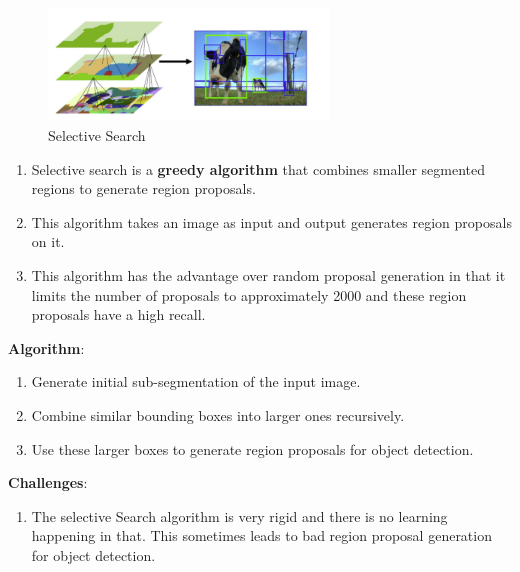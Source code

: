 \begin{table}[h]
    \begin{minipage}[t]{0.39\linewidth}
        \begin{figure}[H]
            \centering
            \includegraphics[width=\linewidth, height=3cm, keepaspectratio]{Pictures/convolutional-neural-network/rcnn-selective-search.png}
            \caption{Selective Search}
        \end{figure}        
    \end{minipage}
    \hfill
    \begin{minipage}[t]{0.59\linewidth}
        \begin{enumerate}
            \item Selective search is a \textbf{greedy algorithm} that combines smaller segmented regions to generate region proposals.
            
            \item This algorithm takes an image as input and output generates region proposals on it.
        
            \item This algorithm has the advantage over random proposal generation in that it limits the number of proposals to approximately 2000 and these region proposals have a high recall.
        \end{enumerate}    
    \end{minipage}
\end{table}


\vspace{0.2cm}
\textbf{Algorithm}:
\begin{enumerate}
    \item Generate initial sub-segmentation of the input image.

    \item Combine similar bounding boxes into larger ones recursively.

    \item Use these larger boxes to generate region proposals for object detection.
\end{enumerate}

\vspace{0.2cm}
\textbf{Challenges}:
\begin{enumerate}
    \item The selective Search algorithm is very rigid and there is no learning happening in that. This sometimes leads to bad region proposal generation for object detection.
\end{enumerate}






